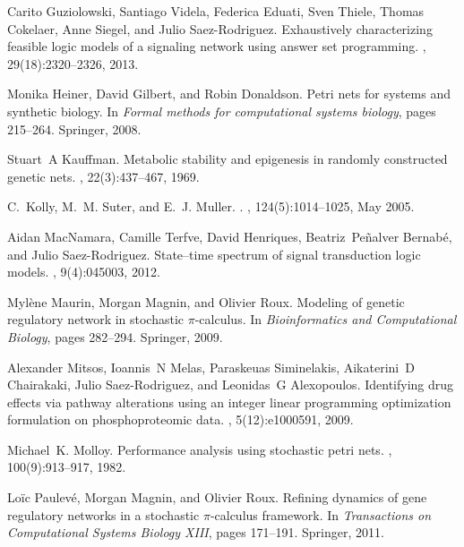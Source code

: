 \documentclass[runningheads,a4paper]{llncs}
\begin{document}
\begin{thebibliography}{10}
Carito Guziolowski, Santiago Videla, Federica Eduati, Sven Thiele, Thomas
  Cokelaer, Anne Siegel, and Julio Saez-Rodriguez.
\newblock Exhaustively characterizing feasible logic models of a signaling
  network using answer set programming.
, 29(18):2320--2326, 2013.

Monika Heiner, David Gilbert, and Robin Donaldson.
\newblock Petri nets for systems and synthetic biology.
\newblock In {\em Formal methods for computational systems biology}, pages
  215--264. Springer, 2008.

Stuart~A Kauffman.
\newblock Metabolic stability and epigenesis in randomly constructed genetic
  nets.
, 22(3):437--467, 1969.

C.~Kolly, M.~M. Suter, and E.~J. Muller.
.
, 124(5):1014--1025, May 2005.

Aidan MacNamara, Camille Terfve, David Henriques, Beatriz~Pe{\~n}alver
  Bernab{\'e}, and Julio Saez-Rodriguez.
\newblock State--time spectrum of signal transduction logic models.
, 9(4):045003, 2012.

Myl{\`e}ne Maurin, Morgan Magnin, and Olivier Roux.
\newblock Modeling of genetic regulatory network in stochastic $\pi$-calculus.
\newblock In {\em Bioinformatics and Computational Biology}, pages 282--294.
  Springer, 2009.

Alexander Mitsos, Ioannis~N Melas, Paraskeuas Siminelakis, Aikaterini~D
  Chairakaki, Julio Saez-Rodriguez, and Leonidas~G Alexopoulos.
\newblock Identifying drug effects via pathway alterations using an integer
  linear programming optimization formulation on phosphoproteomic data.
, 5(12):e1000591, 2009.

Michael~K. Molloy.
\newblock Performance analysis using stochastic petri nets.
, 100(9):913--917, 1982.

{L}o{\"i}c {P}aulev{\'e}, {M}organ {M}agnin, and {O}livier {R}oux.
\newblock Refining dynamics of gene regulatory networks in a stochastic
  $\pi$-calculus framework.
\newblock In {\em Transactions on Computational Systems Biology XIII}, pages
  171--191. Springer, 2011.


\end{thebibliography}
\end{document}
